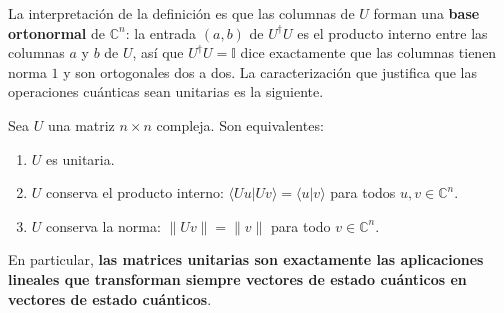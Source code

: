 \documentclass[11pt, a4paper, twoside, openright]{report}
\begin{document}
\noindent La interpretación de la definición es que las columnas de $U$ forman una \textbf{base ortonormal} de $\mathbb{C}^n$: la entrada $(a,b)$ de $U^\dagger U$ es el producto interno entre las columnas $a$ y $b$ de $U$, así que $U^\dagger U = \mathbb{I}$ dice exactamente que las columnas tienen norma $1$ y son ortogonales dos a dos. La caracterización que justifica que las operaciones cuánticas sean unitarias es la siguiente.

\begin{tcolorbox}[colback=teal!5!white,colframe=teal!75!black,title=\textbf{Proposición: Las unitarias son las que conservan la norma}]
Sea $U$ una matriz $n \times n$ compleja. Son equivalentes:
\begin{enumerate}
    \item $U$ es unitaria.
    \item $U$ conserva el producto interno: $\langle Uu|Uv\rangle = \langle u|v\rangle$ para todos $u, v \in \mathbb{C}^n$.
    \item $U$ conserva la norma: $\|Uv\| = \|v\|$ para todo $v \in \mathbb{C}^n$.
\end{enumerate}
En particular, \textbf{las matrices unitarias son exactamente las aplicaciones lineales que transforman siempre vectores de estado cuánticos en vectores de estado cuánticos}.
\end{tcolorbox}
\end{document}
